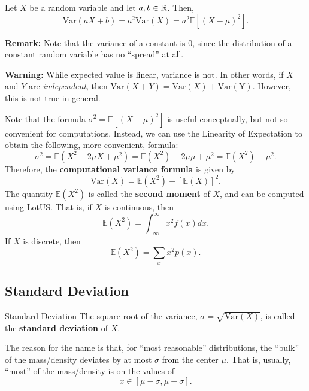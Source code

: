 \begin{theorem}{}{}
    Let $X$ be a random variable and let $a, b \in \mathbb{R}$. Then, 
    \[\text{Var}(aX + b) = a^2\text{Var}(X) = a^2 \mathbb{E}[(X - \mu)^2].\]
\end{theorem}
\textbf{Remark:} Note that the variance of a constant is 0, since the distribution of a constant random variable has no ``spread'' at all. 

\textbf{Warning:} While expected value is linear, variance is not. In other words, if $X$ and $Y$ are \emph{independent}, then $\text{Var}(X + Y) = \text{Var}(X) + \text{Var}(\text{Y})$. However, this is not true in general. 

\bigskip 

Note that the formula $\sigma^2 = \mathbb{E}[(X - \mu)^2]$ is useful conceptually, but not so convenient for computations. Instead, we can use the Linearity of Expectation to obtain the following, more convenient, formula: 
\[\sigma^2 = \mathbb{E}(X^2 - 2\mu X + \mu^2) = \mathbb{E}(X^2) - 2\mu \mu + \mu^2 = \mathbb{E}(X^2) - \mu^2.\]
Therefore, the \textbf{computational variance formula} is given by 
\[\boxed{\text{Var}(X) = \mathbb{E}(X^2) - [\mathbb{E}(X)]^2}.\]
The quantity $\mathbb{E}(X^2)$ is called the \textbf{second moment} of $X$, and can be computed using LotUS. That is, if $X$ is continuous, then 
\[\mathbb{E}(X^2) = \int_{-\infty}^{\infty} x^2 f(x) dx.\]
If $X$ is discrete, then 
\[\mathbb{E}(X^2) = \sum_{x} x^2 p(x).\]

\subsection{Standard Deviation}
\begin{definition}{Standard Deviation}{}
    The square root of the variance, $\sigma = \sqrt{\text{Var}(X)}$, is called the \textbf{standard deviation} of $X$.
\end{definition}
The reason for the name is that, for ``most reasonable'' distributions, the ``bulk'' of the mass/density deviates by at most $\sigma$ from the center $\mu$. That is, usually, ``most'' of the mass/density is on the values of 
\[x \in [\mu - \sigma, \mu + \sigma].\]

